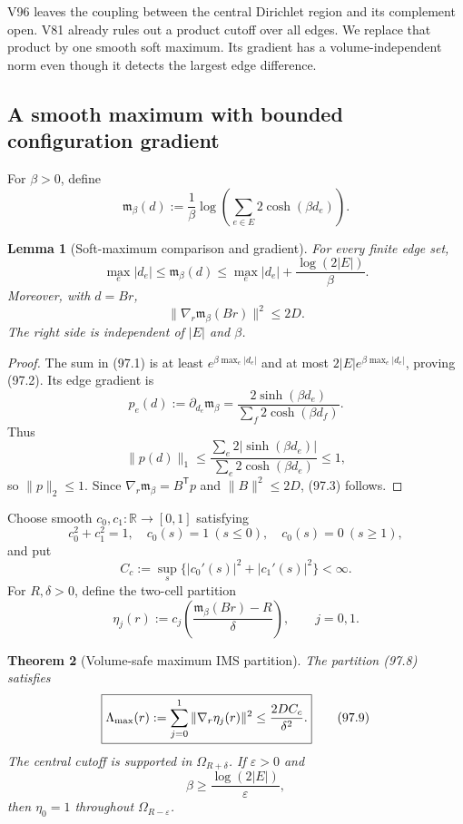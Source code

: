 \documentclass[11pt]{article}
\newtheorem{theorem}{Theorem}[section]
\newtheorem{lemma}[theorem]{Lemma}
\theoremstyle{remark}
\begin{document}
V96 leaves the coupling between the central Dirichlet region and its
complement open.  V81 already rules out a product cutoff over all
edges.  We replace that product by one smooth soft maximum.  Its
gradient has a volume-independent norm even though it detects the
largest edge difference.

\subsection{A smooth maximum with bounded configuration gradient}

For \(\beta>0\), define
\[
 \mathfrak m_\beta(d)
 :=\frac1\beta\log
   \left(\sum_{e\in E}2\cosh(\beta d_e)\right).      \tag{97.1}
\]

\begin{lemma}[Soft-maximum comparison and gradient]
\label{lem:v17v97-softmax}
For every finite edge set,
\[
 \max_e|d_e|
 \leq\mathfrak m_\beta(d)
 \leq\max_e|d_e|+\frac{\log(2|E|)}\beta.            \tag{97.2}
\]
Moreover, with \(d=Br\),
\[
\boxed{
 \|\nabla_r\mathfrak m_\beta(Br)\|^2\leq2D.}       \tag{97.3}
\]
The right side is independent of \(|E|\) and \(\beta\).
\end{lemma}

\begin{proof}
The sum in (97.1) is at least
\(e^{\beta\max_e|d_e|}\) and at most
\(2|E|e^{\beta\max_e|d_e|}\), proving (97.2).  Its edge gradient is
\[
 p_e(d):=\partial_{d_e}\mathfrak m_\beta
 =\frac{2\sinh(\beta d_e)}
        {\sum_f2\cosh(\beta d_f)}.                  \tag{97.4}
\]
Thus
\[
 \|p(d)\|_1
 \leq\frac{\sum_e2|\sinh(\beta d_e)|}
              {\sum_e2\cosh(\beta d_e)}\leq1,       \tag{97.5}
\]
so \(\|p\|_2\leq1\).  Since
\(\nabla_r\mathfrak m_\beta=B^{\mathsf T}p\) and
\(\|B\|^2\leq2D\), (97.3) follows.
\end{proof}

Choose smooth \(c_0,c_1:\mathbb R\to[0,1]\) satisfying
\[
 c_0^2+c_1^2=1,
 \quad c_0(s)=1\ (s\leq0),
 \quad c_0(s)=0\ (s\geq1),                          \tag{97.6}
\]
and put
\[
 C_c:=\sup_s\{|c_0'(s)|^2+|c_1'(s)|^2\}<\infty.    \tag{97.7}
\]
For \(R,\delta>0\), define the two-cell partition
\[
 \eta_j(r):=c_j\left(
 \frac{\mathfrak m_\beta(Br)-R}{\delta}
 \right),\qquad j=0,1.                              \tag{97.8}
\]

\begin{theorem}[Volume-safe maximum IMS partition]
\label{thm:v17v97-ims}
The partition (97.8) satisfies
\[
\boxed{
 \Lambda_{\rm max}(r)
 :=\sum_{j=0}^1\|\nabla_r\eta_j(r)\|^2
 \leq\frac{2DC_c}{\delta^2}.}                      \tag{97.9}
\]
The central cutoff is supported in \(\Omega_{R+\delta}\).  If
\(\varepsilon>0\) and
\[
 \beta\geq\frac{\log(2|E|)}{\varepsilon},           \tag{97.10}
\]
then \(\eta_0=1\) throughout \(\Omega_{R-\varepsilon}\).
\end{theorem}
\end{document}
